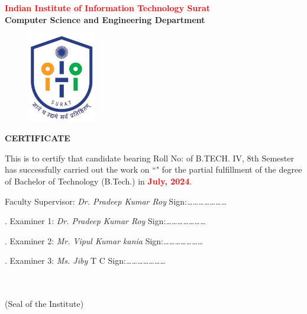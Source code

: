 \thispagestyle{plain}

\begin{center}
{\Large {\textbf {\textcolor{red}{Indian Institute of Information Technology Surat}\\Computer Science and Engineering Department}}}
\end{center}

\vspace{1.25cm}
\justify


\begin{figure}[h]
    \centering
    \includegraphics[width=30mm]{Formalities/IIIT_Surat_logo}\label{fig:figure}
\end{figure}

\begin{center}
{\Large {\bf \uppercase{Certificate}}}
\end{center}
\vspace{1.5cm}
\normalsize
\noindent This is to certify that candidate \textcolor{red}{\textbf{\myname}} bearing Roll No: \textcolor{red}{\textbf{\myrollno}} of B.TECH. IV, 8th Semester has successfully carried out the work on  ``\textcolor{red}{\textbf{\myprojectname}}" for the partial fulfillment of the degree of Bachelor of Technology (B.Tech.) in \textcolor{red}{\textbf{July, 2024}}.

\vspace{3\baselineskip}

\noindent Faculty Supervisor: \emph{Dr. Pradeep Kumar Roy}   \hfill Sign:\emph{…………………}\\
\vspace{1cm}

.  Examiner 1: \emph{ Dr. Pradeep Kumar Roy} \hfill Sign:\emph{…………………}\\
\vspace{0.3cm}

.  Examiner 2: \emph{ Mr. Vipul Kumar kania} \hfill Sign:\emph{…………………}\\
\vspace{0.3cm}

.  Examiner 3: \emph{ Ms. Jiby} T C \hfill Sign:\emph{…………………}\\
\vspace{0.3cm}

\begin{flushright} 

{\small \bf \textcolor{white}{}}\\
{\small \bf \textcolor{white}{}}\\
{\small (Seal of the Institute)} \\
\end{flushright}



